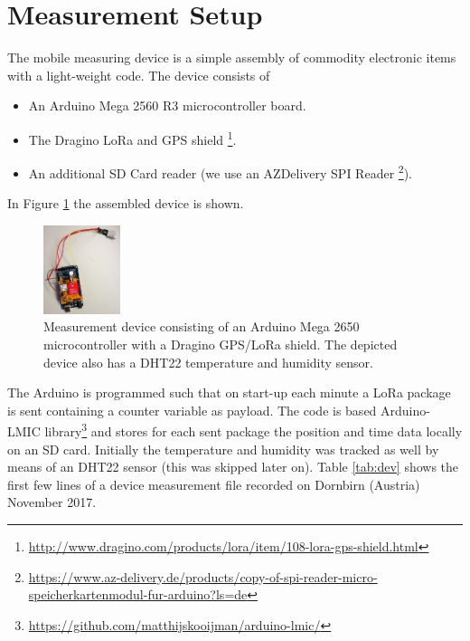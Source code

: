 \section{Measurement Setup}\label{sec:setup}

The mobile measuring device is a simple assembly of commodity electronic items with a light-weight code. The device consists of
\begin{itemize}
\item An Arduino Mega 2560 R3 microcontroller board.
\item The Dragino LoRa and GPS shield \footnote{\url{http://www.dragino.com/products/lora/item/108-lora-gps-shield.html}}.
\item An additional SD Card reader (we use an AZDelivery SPI Reader \footnote{\url{https://www.az-delivery.de/products/copy-of-spi-reader-micro-speicherkartenmodul-fur-arduino?ls=de}}).
\end{itemize}
In Figure \ref{fig:device} the assembled device is shown. 

\begin{figure}[h!]\label{fig:device}
\centering
\includegraphics[width=0.2\textwidth]{figures/device}
\caption{Measurement device consisting of an Arduino Mega 2650 microcontroller with a Dragino GPS/LoRa shield. The depicted device also has a DHT22 temperature and humidity sensor.}
\end{figure}

The Arduino is programmed such that on start-up each minute a LoRa package is sent containing a counter variable as payload. The code is based Arduino-LMIC library\footnote{\url{https://github.com/matthijskooijman/arduino-lmic/}} and stores for each sent package the position and time data locally on an SD card. Initially the temperature and humidity was tracked as well by means of an DHT22 sensor (this was skipped later on). Table \ref{tab:dev} shows the first few lines of a device measurement file recorded on Dornbirn (Austria) November 2017. 

